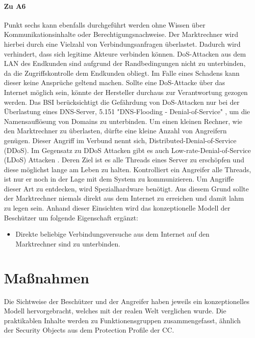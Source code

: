 \documentclass[11pt,a4paper]{report}
\begin{document}
\paragraph{Zu A6} Punkt sechs kann ebenfalls durchgeführt werden ohne Wissen über Kommunikationsinhalte oder Berechtigungsnachweise. Der Marktrechner wird hierbei durch eine Vielzahl von Verbindungsanfragen überlastet. Dadurch wird verhindert, dass sich legitime Akteure verbinden können. DoS-Attacken aus dem LAN des Endkunden sind aufgrund der Randbedingungen nicht zu unterbinden, da die Zugriffskontrolle dem Endkunden obliegt. Im Falle eines Schadens kann dieser keine Ansprüche geltend machen. Sollte eine DoS-Attacke über das Internet möglich sein, könnte der Hersteller durchaus zur Verantwortung gezogen werden. Das BSI berücksichtigt die Gefährdung von DoS-Attacken nur bei der Überlastung eines DNS-Server, 5.151 "DNS-Flooding - Denial-of-Service" \cite{bsi_g5151}, um die Namensauflösung von Domains zu unterbinden. Um einen kleinen Rechner, wie den Marktrechner zu überlasten, dürfte eine kleine Anzahl von Angreifern genügen. Dieser Angriff im Verbund nennt sich, Distributed-Denial-of-Service (DDoS). Im Gegensatz zu DDoS Attacken gibt es auch Low-rate-Denial-of-Service (LDoS) Attacken \cite[s.~303]{gutmann}. Deren Ziel ist es alle Threads eines Server zu erschöpfen und diese möglichst lange am Leben zu halten. Kontrolliert ein Angreifer alle Threads, ist nur er noch in der Lage mit dem System zu kommunizieren. Um Angriffe dieser Art zu entdecken, wird Spezialhardware benötigt. Aus diesem Grund sollte der Marktrechner niemals direkt aus dem Internet zu erreichen und damit lahm zu legen sein. Anhand dieser Einsichten wird das konzeptionelle Modell der Beschützer um folgende Eigenschaft ergänzt:

\begin{itemize}[leftmargin=*]
\item Direkte beliebige Verbindungsversuche aus dem Internet auf den Marktrechner sind zu unterbinden.
\end{itemize}

\section{Maßnahmen} \label{sec:analysis_measures}

Die Sichtweise der Beschützer und der Angreifer haben jeweils ein konzeptionelles Modell hervorgebracht, welches mit der realen Welt verglichen wurde. Die praktikablen Inhalte werden zu Funktionensgruppen zusammengefasst, ähnlich der Security Objects aus dem Protection Profile der CC.
\end{document}
